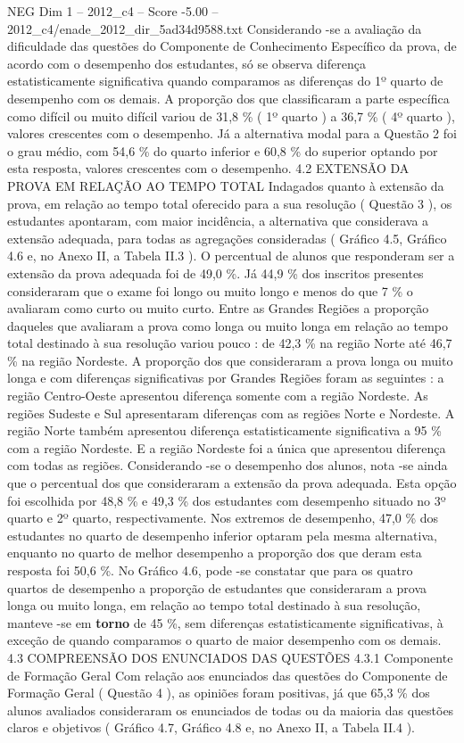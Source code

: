 \begin{textsample}{NEG Dim 1 – 2012\_c4 – Score -5.00 – 2012\_c4/enade\_2012\_dir\_5ad34d9588.txt}
Considerando -se a avaliação da dificuldade das questões do Componente de Conhecimento Específico da prova, de acordo com o desempenho dos estudantes, só se observa diferença estatisticamente significativa quando comparamos as diferenças do 1º quarto de desempenho com os demais.
A proporção dos que classificaram a parte específica como difícil ou muito difícil variou de 31,8 \% ( 1º quarto ) a 36,7 \% ( 4º quarto ), valores crescentes com o desempenho.
Já a alternativa modal para a Questão 2 foi o grau médio, com 54,6 \% do quarto inferior e 60,8 \% do superior optando por esta resposta, valores crescentes com o desempenho. 4.2 EXTENSÃO DA PROVA EM RELAÇÃO AO TEMPO TOTAL Indagados quanto à extensão da prova, em relação ao tempo total oferecido para a sua resolução ( Questão 3 ), os estudantes apontaram, com maior incidência, a alternativa que considerava a extensão adequada, para todas as agregações consideradas ( Gráfico 4.5, Gráfico 4.6 e, no Anexo II, a Tabela II.3 ).
O percentual de alunos que responderam ser a extensão da prova adequada foi de 49,0 \%.
Já 44,9 \% dos inscritos presentes consideraram que o exame foi longo ou muito longo e menos do que 7 \% o avaliaram como curto ou muito curto.
Entre as Grandes Regiões a proporção daqueles que avaliaram a prova como longa ou muito longa em relação ao tempo total destinado à sua resolução variou pouco : de 42,3 \% na região Norte até 46,7 \% na região Nordeste.
A proporção dos que consideraram a prova longa ou muito longa e com diferenças significativas por Grandes Regiões foram as seguintes : a região Centro-Oeste apresentou diferença somente com a região Nordeste.
As regiões Sudeste e Sul apresentaram diferenças com as regiões Norte e Nordeste.
A região Norte também apresentou diferença estatisticamente significativa a 95 \% com a região Nordeste.
E a região Nordeste foi a única que apresentou diferença com todas as regiões.
Considerando -se o desempenho dos alunos, nota -se ainda que o percentual dos que consideraram a extensão da prova adequada.
Esta opção foi escolhida por 48,8 \% e 49,3 \% dos estudantes com desempenho situado no 3º quarto e 2º quarto, respectivamente.
Nos extremos de desempenho, 47,0 \% dos estudantes no quarto de desempenho inferior optaram pela mesma alternativa, enquanto no quarto de melhor desempenho a proporção dos que deram esta resposta foi 50,6 \%.
No Gráfico 4.6, pode -se constatar que para os quatro quartos de desempenho a proporção de estudantes que consideraram a prova longa ou muito longa, em relação ao tempo total destinado à sua resolução, manteve -se em \textbf{torno} de 45 \%, sem diferenças estatisticamente significativas, à exceção de quando comparamos o quarto de maior desempenho com os demais. 4.3 COMPREENSÃO DOS ENUNCIADOS DAS QUESTÕES 4.3.1 Componente de Formação Geral Com relação aos enunciados das questões do Componente de Formação Geral ( Questão 4 ), as opiniões foram positivas, já que 65,3 \% dos alunos avaliados consideraram os enunciados de todas ou da maioria das questões claros e objetivos ( Gráfico 4.7, Gráfico 4.8 e, no Anexo II, a Tabela II.4 ).

\end{textsample}
